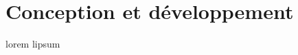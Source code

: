 \section{Conception et développement}

\begin{frame}
\tableofcontents[currentsection]
\end{frame}
\begin{frame}
lorem lipsum
\end{frame}